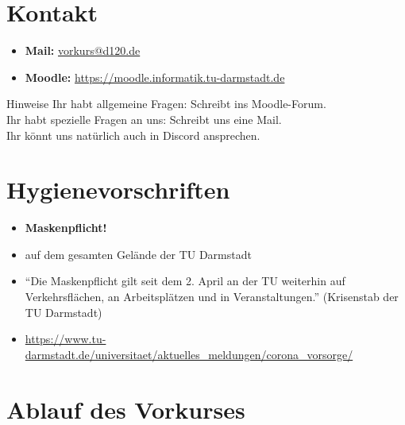 \section{Kontakt}
\begin{frame}
	\slidehead
	\begin{itemize}
		\item \textbf{Mail:} \href{mailto:vorkurs@d120.de}{vorkurs@d120.de}
		\item \textbf{Moodle:}  \href{https://moodle.informatik.tu-darmstadt.de/course/view.php?id=624} {https://moodle.informatik.tu-darmstadt.de}
	\end{itemize}
	\vspace{2.5cm}
	\begin{alertblock}{Hinweise}
		Ihr habt allgemeine Fragen: Schreibt ins Moodle-Forum. \\
		Ihr habt spezielle Fragen an uns: Schreibt uns eine Mail. \\
		Ihr könnt uns natürlich auch in Discord ansprechen.
	\end{alertblock}
\end{frame}

\section{Hygienevorschriften}
\begin{frame}
	\slidehead
	\begin{itemize}
		\item \textbf{Maskenpflicht!}
		\item auf dem gesamten Gelände der TU Darmstadt
		\item ``Die Maskenpflicht gilt seit dem 2. April an der TU weiterhin auf Verkehrsflächen, an Arbeitsplätzen und in Veranstaltungen.'' (Krisenstab der TU Darmstadt)
		\item \href{https://www.tu-darmstadt.de/universitaet/aktuelles_meldungen/corona_vorsorge/}{https://www.tu-darmstadt.de/universitaet/aktuelles\_meldungen/corona\_vorsorge/}
	\end{itemize}
\end{frame}

\section{Ablauf des Vorkurses}
